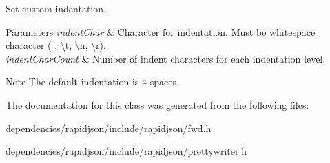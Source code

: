 Set custom indentation. 


\begin{DoxyParams}{Parameters}
{\em indent\+Char} & Character for indentation. Must be whitespace character (\textquotesingle{} \textquotesingle{}, \textquotesingle{}\textbackslash{}t\textquotesingle{}, \textquotesingle{}\textbackslash{}n\textquotesingle{}, \textquotesingle{}\textbackslash{}r\textquotesingle{}). \\
\hline
{\em indent\+Char\+Count} & Number of indent characters for each indentation level. \\
\hline
\end{DoxyParams}
\begin{DoxyNote}{Note}
The default indentation is 4 spaces. 
\end{DoxyNote}


The documentation for this class was generated from the following files\+:\begin{DoxyCompactItemize}
\item 
dependencies/rapidjson/include/rapidjson/fwd.\+h\item 
dependencies/rapidjson/include/rapidjson/prettywriter.\+h\end{DoxyCompactItemize}
